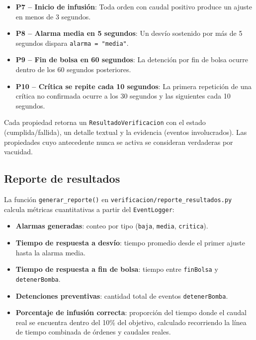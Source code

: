 \documentclass[12pt,a4paper]{article}
\begin{document}
\begin{itemize}
    \item \textbf{P7 -- Inicio de infusión}: Toda orden con caudal
    positivo produce un ajuste en menos de 3 segundos.
    \item \textbf{P8 -- Alarma media en 5 segundos}: Un desvío
    sostenido por más de 5 segundos dispara \texttt{alarma = "media"}.
    \item \textbf{P9 -- Fin de bolsa en 60 segundos}: La detención
    por fin de bolsa ocurre dentro de los 60 segundos posteriores.
    \item \textbf{P10 -- Crítica se repite cada 10 segundos}: La
    primera repetición de una crítica no confirmada ocurre a los
    30 segundos y las siguientes cada 10 segundos.
\end{itemize}

Cada propiedad retorna un \texttt{ResultadoVerificacion} con el
estado (cumplida/fallida), un detalle textual y la evidencia
(eventos involucrados).  Las propiedades cuyo antecedente nunca se
activa se consideran verdaderas por vacuidad.

\subsection{Reporte de resultados}

La función \texttt{generar\_reporte()} en
\texttt{verificacion/reporte\_resultados.py} calcula métricas
cuantitativas a partir del \texttt{EventLogger}:

\begin{itemize}
    \item \textbf{Alarmas generadas}: conteo por tipo
    (\texttt{baja}, \texttt{media}, \texttt{critica}).
    \item \textbf{Tiempo de respuesta a desvío}: tiempo promedio
    desde el primer ajuste hasta la alarma media.
    \item \textbf{Tiempo de respuesta a fin de bolsa}: tiempo entre
    \texttt{finBolsa} y \texttt{detenerBomba}.
    \item \textbf{Detenciones preventivas}: cantidad total de
    eventos \texttt{detenerBomba}.
    \item \textbf{Porcentaje de infusión correcta}: proporción del
    tiempo donde el caudal real se encuentra dentro del 10\% del
    objetivo, calculado recorriendo la línea de tiempo combinada de
    órdenes y caudales reales.
\end{itemize}
\end{document}

